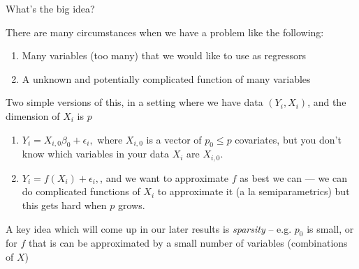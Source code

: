 \documentclass[notes,11pt, aspectratio=169]{beamer}
\newenvironment{wideitemize}{\itemize\addtolength{\itemsep}{10pt}}{\enditemize}
\begin{document}
\begin{frame}{What's the big idea?}
  \begin{wideitemize}
  \item There are many circumstances when we have a problem like the following:
    \begin{enumerate}
    \item Many variables (too many) that we would like to use as regressors
    \item A unknown and potentially complicated function of many variables
    \end{enumerate}
  \item Two simple versions of this, in a setting where we have data
    $(Y_{i}, X_{i})$, and the dimension of $X_{i}$ is $p$
    \begin{enumerate}
    \item $Y_{i} = X_{i,0}\beta_{0} + \epsilon_{i},$ where $X_{i,0}$ is a
      vector of $p_{0} \leq p$ covariates, but you don't
      know which variables in your data $X_{i}$ are $X_{i,0}$. 
    \item $Y_{i} = f(X_{i}) + \epsilon_{i},$, and we want to
      approximate $f$ as best we can --- we can do complicated
      functions of $X_{i}$ to approximate it (a la semiparametrics)
      but this gets hard when $p$ grows.
    \end{enumerate}
    \item A key idea which will come up in our later results is
      \emph{sparsity} -- e.g. $p_{0}$ is small, or for $f$ that is can
      be approximated by a small number of variables (combinations of
      $X$)
  \end{wideitemize}
\end{frame}
\end{document}
